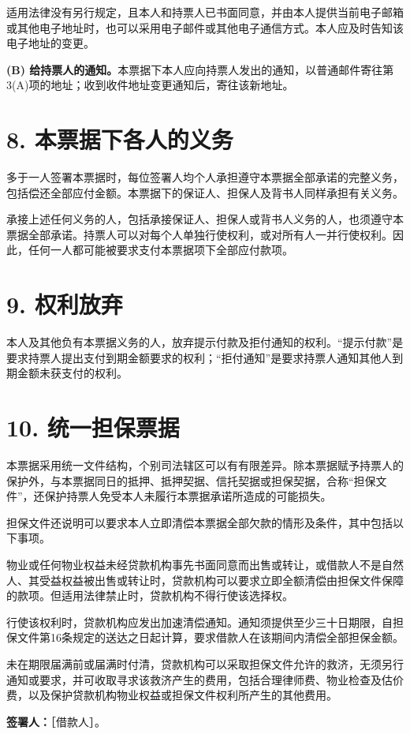 \documentclass[UTF8,fontset=none,11pt,a4paper]{ctexart}
\begin{document}
适用法律没有另行规定，且本人和持票人已书面同意，并由本人提供当前电子邮箱或其他电子地址时，也可以采用电子邮件或其他电子通信方式。本人应及时告知该电子地\allowbreak\mbox{址的变更。}


\textbf{(B) 给持票人的通知。}本票据下本人应向持票人发出的通知，以普通邮件寄往第3(A)项的地址；收到收件地址变更通知后，寄往\allowbreak\mbox{该新地址。}


\section*{8. 本票据下各人的义务}
多于一人签署本票据时，每位签署人均个人承担遵守本票据全部承诺的完整义务，包括偿还全部应付金额。本票据下的保证人、担保人及背书人同样承担\allowbreak\mbox{有关义务。}


承接上述任何义务的人，包括承接保证人、担保人或背书人义务的人，也须遵守本票据全部承诺。持票人可以对每个人单独行使权利，或对所有人一并行使权利。因此，任何一人都可能被要求支付本票据项下全部\allowbreak\mbox{应付款项。}


\section*{9. 权利放弃}
本人及其他负有本票据义务的人，放弃提示付款及拒付通知的权利。“提示付款”是要求持票人提出支付到期金额要求的权利；“拒付通知”是要求持票人通知其他人到期金额未获支\allowbreak\mbox{付的权利。}


\section*{10. 统一担保票据}
本票据采用统一文件结构，个别司法辖区可以有有限差异。除本票据赋予持票人的保护外，与本票据同日的抵押、抵押契据、信托契据或担保契据，合称“担保文件”，还保护持票人免受本人未履行本票据承诺所造成的\allowbreak\mbox{可能损失。}


担保文件还说明可以要求本人立即清偿本票据全部欠款的情形及条件，其中包括\allowbreak\mbox{以下事项。}


物业或任何物业权益未经贷款机构事先书面同意而出售或转让，或借款人不是自然人、其受益权益被出售或转让时，贷款机构可以要求立即全额清偿由担保文件保障的款项。但适用法律禁止时，贷款机构不得行使\allowbreak\mbox{该选择权。}


行使该权利时，贷款机构应发出加速清偿通知。通知须提供至少三十日期限，自担保文件第16条规定的送达之日起计算，要求借款人在该期间内清偿全部\allowbreak\mbox{担保金额。}


未在期限届满前或届满时付清，贷款机构可以采取担保文件允许的救济，无须另行通知或要求，并可收取寻求该救济产生的费用，包括合理律师费、物业检查及估价费，以及保护贷款机构物业权益或担保文件权利所产生的\allowbreak\mbox{其他费用。}


\textbf{签署人：}［借款人］。
\end{document}
